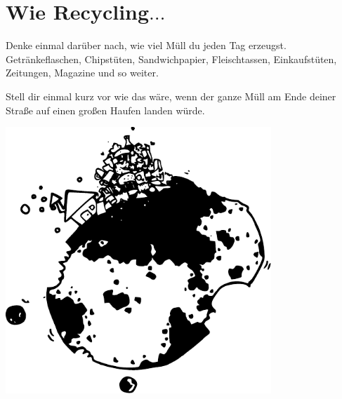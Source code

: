 

\chapter{Wie Recycling$\ldots$}\label{ch:sortoflikerecycling}

Denke einmal darüber nach, wie viel Müll du jeden Tag erzeugst. Getränkeflaschen, Chipstüten, Sandwichpapier, Fleischtassen, Einkaufstüten, Zeitungen, Magazine und so weiter.
\par
Stell dir einmal kurz vor wie das wäre, wenn der ganze Müll am Ende deiner Straße auf einen großen Haufen landen würde.

\begin{center}
\includegraphics*[width=100mm]{images/trash}
\end{center}

